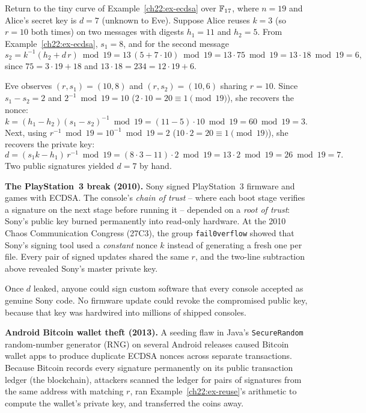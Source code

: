 \begin{example}
\label{ch22:ex-reuse}
Return to the tiny curve of Example~\ref{ch22:ex-ecdsa} over $\mathbb{F}_{17}$, where $n = 19$ and Alice's secret key is $d = 7$ (unknown to Eve). Suppose Alice reuses $k = 3$ (so $r = 10$ both times) on two messages with digests $h_1 = 11$ and $h_2 = 5$. From Example~\ref{ch22:ex-ecdsa}, $s_1 = 8$, and for the second message
\[
  s_2 = k^{-1}(h_2 + d\,r) \bmod 19 = 13\,(5 + 7\cdot 10)\bmod 19 = 13\cdot 75 \bmod 19 = 13\cdot 18 \bmod 19 = 6,
\]
since $75 = 3\cdot 19 + 18$ and $13\cdot 18 = 234 = 12\cdot 19 + 6$.

Eve observes $(r, s_1) = (10, 8)$ and $(r, s_2) = (10, 6)$ sharing $r = 10$. Since $s_1 - s_2 = 2$ and $2^{-1} \bmod 19 = 10$ ($2\cdot 10 = 20 \equiv 1 \pmod{19}$), she recovers the nonce:
\[
  k = (h_1 - h_2)(s_1 - s_2)^{-1} \bmod 19 = (11 - 5)\cdot 10 \bmod 19 = 60 \bmod 19 = 3.
\]
Next, using $r^{-1} \bmod 19 = 10^{-1} \bmod 19 = 2$ ($10\cdot 2 = 20 \equiv 1 \pmod{19}$), she recovers the private key:
\[
  d = (s_1 k - h_1)\,r^{-1} \bmod 19 = (8\cdot 3 - 11)\cdot 2 \bmod 19 = 13\cdot 2 \bmod 19 = 26 \bmod 19 = 7.
\]
Two public signatures yielded $d = 7$ by hand.
\end{example}

\begin{attackbox}
\textbf{The PlayStation~3 break (2010).} Sony signed PlayStation~3 firmware and games with ECDSA. The console's \emph{chain of trust} -- where each boot stage verifies a signature on the next stage before running it -- depended on a \emph{root of trust}: Sony's public key burned permanently into read-only hardware. At the 2010 Chaos Communication Congress (27C3), the group \texttt{fail0verflow} showed that Sony's signing tool used a \emph{constant} nonce $k$ instead of generating a fresh one per file. Every pair of signed updates shared the same $r$, and the two-line subtraction above revealed Sony's master private key.

Once $d$ leaked, anyone could sign custom software that every console accepted as genuine Sony code. No firmware update could revoke the compromised public key, because that key was hardwired into millions of shipped consoles.
\end{attackbox}

\begin{attackbox}
\textbf{Android Bitcoin wallet theft (2013).} A seeding flaw in Java's \texttt{SecureRandom} random-number generator (RNG) on several Android releases caused Bitcoin wallet apps to produce duplicate ECDSA nonces across separate transactions. Because Bitcoin records every signature permanently on its public transaction ledger (the blockchain), attackers scanned the ledger for pairs of signatures from the same address with matching $r$, ran Example~\ref{ch22:ex-reuse}'s arithmetic to compute the wallet's private key, and transferred the coins away.
\end{attackbox}

